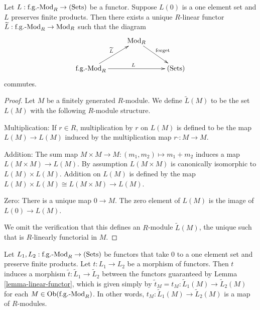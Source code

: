 \begin{lemma}
\label{lemma-linear-functor}
Let $L: \textnormal{f.g.-Mod}_{R} \rightarrow \textnormal{(Sets)}$ be a 
functor.  Suppose $L(0)$ is a one element set and $L$ preserves finite 
products.  Then there exists a unique $R$-linear functor $\widetilde{L}: 
\textnormal{f.g.-Mod}_{R} \rightarrow \textnormal{Mod}_{R}$ such that the 
diagram
\[ 
\xymatrix{
& \textnormal{Mod}_{R} \ar[dr]^{\textnormal{forget}} &   \\
\textnormal{f.g.-Mod}_{R}  \ar[ur]^{\widetilde{L}} \ar[rr]^{L} &  & 
\textnormal{(Sets)}
}
\]
commutes.
\end{lemma}

\begin{proof}
Let $M$ be a finitely generated $R$-module. We define $\widetilde{L}(M)$ to be 
the set $L(M)$ with the following $R$-module structure.

\medskip \noindent
Multiplication: If $r \in R$, multiplication by $r$ on $L(M)$ is defined to be 
the map $L(M) \rightarrow L(M)$ induced by the multiplication map $r \cdot: M 
\rightarrow M$.

\medskip \noindent
Addition: The sum map $M \times M \rightarrow M: (m_1,m_2) \mapsto m_1 + m_2$ 
induces a map $L(M \times M) \rightarrow L(M)$. By assumption $L(M \times M)$ 
is canonically isomorphic to $L(M) \times L(M)$.  Addition on $L(M)$ is defined 
by the map $L(M) \times L(M) \cong L(M \times M) \rightarrow L(M)$.

\medskip \noindent
Zero: There is a unique map $0 \rightarrow M$.  The zero element of $L(M)$ is 
the image of $L(0) \rightarrow L(M)$.

\medskip \noindent
We omit the verification that this defines an $R$-module $\widetilde{L}(M)$, 
the unique such that is $R$-linearly functorial in $M$.
\end{proof}

\begin{lemma}
\label{lemma-morphism-linear-functors}
Let $L_1,L_2: \textnormal{f.g.-Mod}_R \rightarrow \textnormal{(Sets)}$ be 
functors that take $0$ to a one element set and preserve finite products.  Let 
$t: L_1 \rightarrow L_2$ be a morphism of functors. Then $t$ induces a morphism 
$\widetilde{t}: \widetilde{L}_1 \rightarrow \widetilde{L}_2$ between the 
functors guaranteed by Lemma \ref{lemma-linear-functor}, which is given simply 
by $\widetilde{t}_M = t_M: \widetilde{L}_1(M) \rightarrow \widetilde{L}_2(M)$ 
for each $M \in \textnormal{Ob}(\textnormal{f.g.-Mod}_{R})$. In other words, 
$t_M: \widetilde{L}_1(M) \rightarrow \widetilde{L}_2(M)$ is a map of 
$R$-modules.
\end{lemma}

